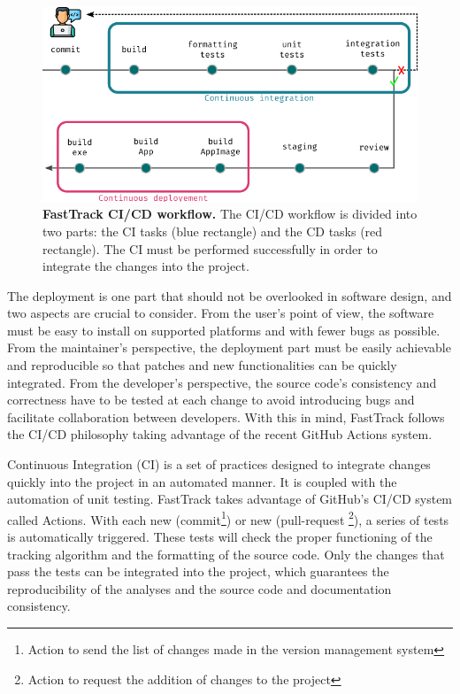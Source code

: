     \begin{figure}[h!]
    \centering
    \includegraphics[width=1\textwidth]{part_1/assets/Figure_cicd.png}
    \caption{{\bf FastTrack CI/CD workflow.} The CI/CD workflow is divided into two parts: the CI tasks (blue rectangle) and the CD tasks (red rectangle). The CI must be performed successfully in order to integrate the changes into the project.}
    \label{part_1:fig_cicd}
    \end{figure}

    The deployment is one part that should not be overlooked in software design, and two aspects are crucial to consider. From the user's point of view, the software must be easy to install on supported platforms and with fewer bugs as possible. From the maintainer's perspective, the deployment part must be easily achievable and reproducible so that patches and new functionalities can be quickly integrated. From the developer's perspective, the source code's consistency and correctness have to be tested at each change to avoid introducing bugs and facilitate collaboration between developers.  With this in mind, FastTrack follows the CI/CD philosophy \cite{shahin2017continuous}\cite{wikstrom2019benefits} taking advantage of the recent GitHub Actions system.

    Continuous Integration (CI) is a set of practices designed to integrate changes quickly into the project in an automated manner. It is coupled with the automation of unit testing. FastTrack takes advantage of GitHub's CI/CD system called Actions. With each new (commit\footnote{Action to send the list of changes made in the version management system}) or new (pull-request \footnote{Action to request the addition of changes to the project}), a series of tests is automatically triggered. These tests will check the proper functioning of the tracking algorithm and the formatting of the source code. Only the changes that pass the tests can be integrated into the project, which guarantees the reproducibility of the analyses and the source code and documentation consistency.

